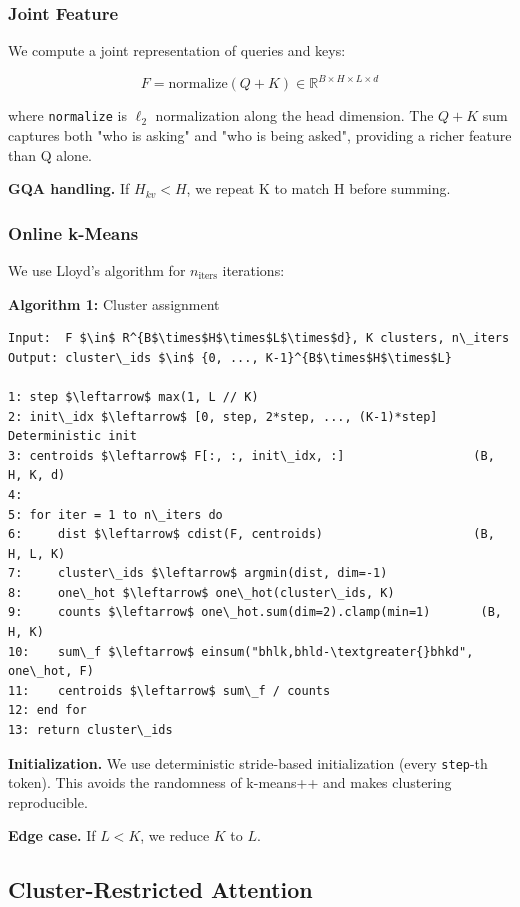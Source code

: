 \subsubsection{Joint Feature}

We compute a joint representation of queries and keys:

\[
F = \text{normalize}(Q + K) \in \mathbb{R}^{B \times H \times L \times d}
\tag{4.1}
\]

where \texttt{normalize} is $\ell_2$ normalization along the head dimension. The 
$Q + K$ sum captures both "who is asking" and "who is being asked", 
providing a richer feature than Q alone.

\textbf{GQA handling.} If $H_{kv} < H$, we repeat K to match H before summing.

\subsubsection{Online k-Means}

We use Lloyd's algorithm for $n_{\text{iters}}$ iterations:

\textbf{Algorithm 1:} Cluster assignment
\begin{lstlisting}
Input:  F $\in$ R^{B$\times$H$\times$L$\times$d}, K clusters, n\_iters
Output: cluster\_ids $\in$ {0, ..., K-1}^{B$\times$H$\times$L}

1: step $\leftarrow$ max(1, L // K)
2: init\_idx $\leftarrow$ [0, step, 2*step, ..., (K-1)*step]    Deterministic init
3: centroids $\leftarrow$ F[:, :, init\_idx, :]                  (B, H, K, d)
4:
5: for iter = 1 to n\_iters do
6:     dist $\leftarrow$ cdist(F, centroids)                     (B, H, L, K)
7:     cluster\_ids $\leftarrow$ argmin(dist, dim=-1)
8:     one\_hot $\leftarrow$ one\_hot(cluster\_ids, K)
9:     counts $\leftarrow$ one\_hot.sum(dim=2).clamp(min=1)       (B, H, K)
10:    sum\_f $\leftarrow$ einsum("bhlk,bhld-\textgreater{}bhkd", one\_hot, F)
11:    centroids $\leftarrow$ sum\_f / counts
12: end for
13: return cluster\_ids
\end{lstlisting}

\textbf{Initialization.} We use deterministic stride-based initialization (every 
\texttt{step}-th token). This avoids the randomness of k-means++ and makes 
clustering reproducible.

\textbf{Edge case.} If $L < K$, we reduce $K$ to $L$.

\subsection{Cluster-Restricted Attention}

